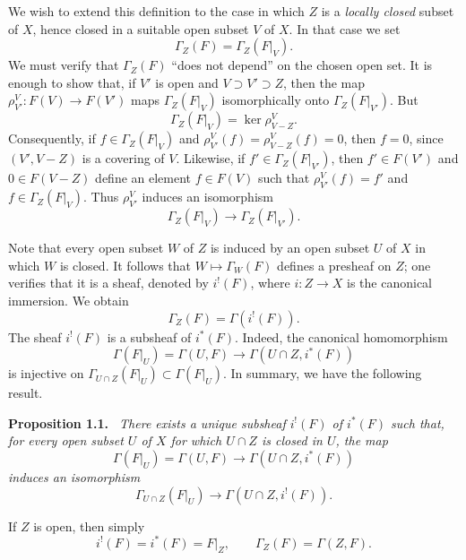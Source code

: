 \documentclass[11pt]{article}
\newcommand{\restr}[2]{#1\vert_{#2}}
\newcommand{\srcpage}[1]{%
  \marginpar{\raggedright\scriptsize\color{rulegray}French printed p.~#1}}
\newenvironment{sgastatement}[1]
  {\par\addvspace{0.8\baselineskip}\noindent\textbf{#1.}\ \itshape}
  {\par\addvspace{0.4\baselineskip}}
\begin{document}
We wish to extend this definition to the case in which $Z$ is a
\emph{locally closed} subset of $X$, hence closed in a suitable open subset
$V$ of $X$.  In that case we set
\begin{equation}
  \Gamma_Z(F)=\Gamma_Z(\restr{F}{V}).
  \tag{3}\label{eq:I.3}
\end{equation}
We must verify that $\Gamma_Z(F)$ ``does not depend'' on the chosen open
set.  It is enough to show that, if $V'$ is open and
$V\supset V'\supset Z$, then the map
$\rho^V_{V'}:F(V)\to F(V')$ maps
$\Gamma_Z(\restr{F}{V})$ isomorphically onto
$\Gamma_Z(\restr{F}{V'})$.  But
\begin{equation}
  \Gamma_Z(\restr{F}{V})=\ker\rho^V_{V-Z}.
  \tag{4}\label{eq:I.4}
\end{equation}
Consequently, if $f\in\Gamma_Z(\restr{F}{V})$ and
$\rho^V_{V'}(f)=\rho^V_{V-Z}(f)=0$, then $f=0$, since
$(V',V-Z)$ is a covering of $V$.  Likewise, if
$f'\in\Gamma_Z(\restr{F}{V'})$, then $f'\in F(V')$ and
\srcpage{7}$0\in F(V-Z)$ define an element $f\in F(V)$ such that
$\rho^V_{V'}(f)=f'$ and $f\in\Gamma_Z(\restr{F}{V})$.
Thus $\rho^V_{V'}$ induces an isomorphism
\[
  \Gamma_Z(\restr{F}{V})\longrightarrow
  \Gamma_Z(\restr{F}{V'}).
\]

Note that every open subset $W$ of $Z$ is induced by an open subset $U$
of $X$ in which $W$ is closed.  It follows that
$W\mapsto\Gamma_W(F)$ defines a presheaf on $Z$; one verifies that it is
a sheaf, denoted by $i^!(F)$, where $i:Z\to X$ is the canonical
immersion.  We obtain
\begin{equation}
  \Gamma_Z(F)=\Gamma(i^!(F)).
  \tag{5}\label{eq:I.5}
\end{equation}
The sheaf $i^!(F)$ is a subsheaf of $i^*(F)$.  Indeed, the canonical
homomorphism
\[
  \Gamma(\restr{F}{U})=\Gamma(U,F)\longrightarrow
  \Gamma(U\cap Z,i^*(F))
\]
is injective on
$\Gamma_{U\cap Z}(\restr{F}{U})\subset\Gamma(\restr{F}{U})$.
In summary, we have the following result.

\begin{sgastatement}{Proposition 1.1}\label{I.1.1}
There exists a unique subsheaf $i^!(F)$ of $i^*(F)$ such that, for every
open subset $U$ of $X$ for which $U\cap Z$ is closed in $U$, the map
\[
  \Gamma(\restr{F}{U})=\Gamma(U,F)\longrightarrow
  \Gamma(U\cap Z,i^*(F))
\]
induces an isomorphism
\[
  \Gamma_{U\cap Z}(\restr{F}{U})\longrightarrow
  \Gamma(U\cap Z,i^!(F)).
\]
\end{sgastatement}

If $Z$ is open, then simply
\begin{equation}
  i^!(F)=i^*(F)=\restr{F}{Z},
  \qquad \Gamma_Z(F)=\Gamma(Z,F).
  \tag{6}\label{eq:I.6}
\end{equation}
\end{document}
